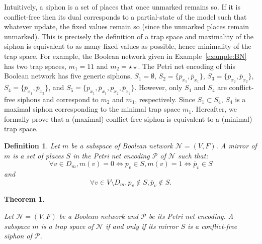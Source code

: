 \documentclass[preprint,12pt]{elsarticle}
\newtheorem{theorem}{Theorem}[section]
\newtheorem{definition}{Definition}[section]
\begin{document}
Intuitively, a siphon is a set of places that once unmarked remains so.
If it is conflict-free then its dual corresponds to a partial-state of the model such that whatever update, the fixed values remain so (since the unmarked places remain unmarked).
This is precisely the definition of a trap space and maximality of the siphon is equivalent to as many fixed values as possible, hence minimality of the trap space.
For example, the Boolean network given in Example~\ref{example:BN} has two trap spaces, \(m_1 = 11\) and \(m_2 = \star\star\).
The Petri net encoding of this Boolean network has five generic siphons, \(S_1 = \emptyset\), \(S_2 = \{p_{x_1}, \overline{p}_{x_1}\}\), \(S_3 = \{p_{x_2}, \overline{p}_{x_2}\}\), \(S_4 = \{\overline{p}_{x_1}, \overline{p}_{x_2}\}\), and \(S_5 = \{p_{x_1}, \overline{p}_{x_1}, p_{x_2}, \overline{p}_{x_2}\}\).
However, only \(S_1\) and \(S_4\) are conflict-free siphons and correspond to \(m_2\) and \(m_1\), respectively.
Since \(S_1 \subset S_4\), \(S_4\) is a maximal siphon corresponding to the minimal trap space \(m_1\).
Hereafter, we formally prove that a (maximal) conflict-free siphon is equivalent to a (minimal) trap space.

\begin{definition}

  Let \(m\) be a subspace of Boolean network \(\mathcal{N} = (V, F)\).
  A \emph{mirror} of \(m\) is a set of places \(S\) in the Petri net encoding \(\mathcal{P}\) of \(\mathcal{N}\) such that:
  \[\forall v \in D_m, m(v) = 0 \Leftrightarrow p_v \in S, m(v) = 1 \Leftrightarrow \overline{p}_v \in S\] and \[\forall v \in V \setminus D_m, p_v \not \in S, \overline{p}_v \not \in S.\]

\end{definition}

\begin{theorem}%
\label{theo:ts_2_sp}

  Let \(\mathcal{N} = (V, F)\) be a Boolean network and \(\mathcal{P}\) be its Petri net encoding. A subspace \(m\) is a trap space of \(\mathcal{N}\) if and only if its mirror \(S\) is a conflict-free siphon of \(\mathcal{P}\).

\end{theorem}
\end{document}
